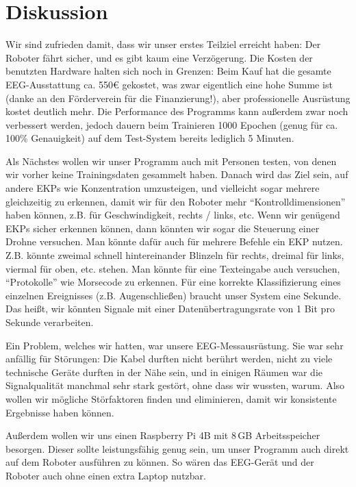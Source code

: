\documentclass[11pt]{scrartcl}
\begin{document}
	\section{Diskussion}

	Wir sind zufrieden damit, dass wir unser erstes Teilziel erreicht haben: Der Roboter fährt sicher, und es gibt kaum eine Verzögerung. Die Kosten der benutzten Hardware halten sich noch in Grenzen: Beim Kauf hat die gesamte EEG-Ausstattung ca. 550€ gekostet, was zwar eigentlich eine hohe Summe ist (danke an den Förderverein für die Finanzierung!), aber professionelle Ausrüstung kostet deutlich mehr. Die Performance des Programms kann außerdem zwar noch verbessert werden, jedoch dauern beim Trainieren 1000 Epochen (genug für ca. 100\% Genauigkeit) auf dem Test-System bereits lediglich 5 Minuten. 

	Als Nächstes wollen wir unser Programm auch mit Personen testen, von denen wir vorher keine Trainingsdaten gesammelt haben.
%
	Danach wird das Ziel sein, auf andere EKPs wie Konzentration umzusteigen, und vielleicht sogar mehrere gleichzeitig zu erkennen, damit wir für den Roboter mehr \enquote{Kontrolldimensionen} haben können, z.B. für Geschwindigkeit, rechts / links, etc. Wenn wir genügend EKPs sicher erkennen können, dann könnten wir sogar die Steuerung einer Drohne versuchen. Man könnte dafür auch für mehrere Befehle ein EKP nutzen. Z.B. könnte zweimal schnell hintereinander Blinzeln für rechts, dreimal für links, viermal für oben, etc. stehen. Man könnte für eine Texteingabe auch versuchen, \enquote{Protokolle} wie Morsecode zu erkennen. Für eine korrekte Klassifizierung eines einzelnen Ereignisses (z.B. Augenschließen) braucht unser System eine Sekunde. Das heißt, wir könnten Signale mit einer Datenübertragungsrate von 1 Bit pro Sekunde verarbeiten.

	Ein Problem, welches wir hatten, war unsere EEG-Messausrüstung. Sie war sehr anfällig für Störungen: Die Kabel durften nicht berührt werden, nicht zu viele technische Geräte durften in der Nähe sein, und in einigen Räumen war die Signalqualität manchmal sehr stark gestört, ohne dass wir wussten, warum. Also wollen wir mögliche Störfaktoren finden und eliminieren, damit wir konsistente Ergebnisse haben können.

	Außerdem wollen wir uns einen Raspberry Pi 4B mit 8\,GB Arbeitsspeicher besorgen. Dieser sollte leistungsfähig genug sein, um unser Programm auch direkt auf dem Roboter ausführen zu können. So wären das EEG-Gerät und der Roboter auch ohne einen extra Laptop nutzbar.
\end{document}
